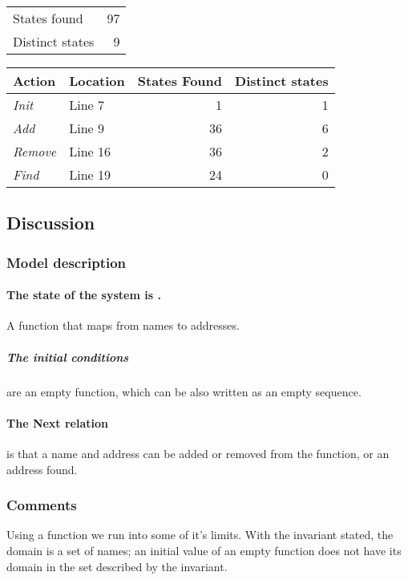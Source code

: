 \documentclass[12pt]{article}
\begin{document}
\begin{table}[h]
\begin{tabular}{lr}
	States found & \num{97} \\
 Distinct states & \num{9} \\ 
\end{tabular}
\end{table}

\begin{table}[h]
\begin{tabular}{llrr}
	\textbf{Action} & Location & States Found & \textbf{Distinct states} \\
	\hline
	\textit{Init}   & Line 7 & 1 & 1 \\
	\textit{Add}    & Line 9 & 36 & 6 \\
	\textit{Remove} & Line 16 & 36 & 2 \\
	\textit{Find}   & Line 19 & 24 & 0 \\
\end{tabular}
\end{table}

\subsection{Discussion}
\subsubsection{Model description} 
\paragraph{The state of the system is .} A function that maps from names to
addresses.

\subparagraph{The initial conditions} are an empty function, which can be also
written as an empty sequence.

\paragraph{The Next relation} is that a name and address can be added or
removed from the function, or an address found.

\subsubsection{Comments}
Using a function we run into some of it's limits.  With the invariant stated,
the domain is a set of names; an initial value of an empty function does not
have its domain in the set described by the invariant.
\end{document}
